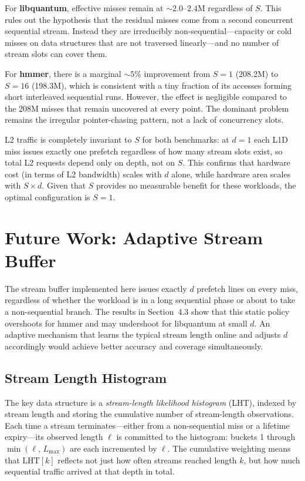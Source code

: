 \documentclass[10pt,twocolumn]{article}
\begin{document}
For \textbf{libquantum}, effective misses remain at ${\sim}2.0$--$2.4$M
regardless of $S$. This rules out the hypothesis that the residual misses
come from a second concurrent sequential stream. Instead they are
irreducibly non-sequential---capacity or cold misses on data structures
that are not traversed linearly---and no number of stream slots can cover
them.

For \textbf{hmmer}, there is a marginal ${\sim}5\%$ improvement from
$S{=}1$ (208.2M) to $S{=}16$ (198.3M), which is consistent with a tiny
fraction of its accesses forming short interleaved sequential runs.
However, the effect is negligible compared to the 208M misses that
remain uncovered at every point. The dominant problem remains the
irregular pointer-chasing pattern, not a lack of concurrency slots.

L2 traffic is completely invariant to $S$ for both benchmarks: at $d=1$
each L1D miss issues exactly one prefetch regardless of how many stream
slots exist, so total L2 requests depend only on depth, not on $S$. This
confirms that hardware cost (in terms of L2 bandwidth) scales with $d$
alone, while hardware area scales with $S \times d$. Given that $S$
provides no measurable benefit for these workloads, the optimal
configuration is $S{=}1$.

\section{Future Work: Adaptive Stream Buffer}
\label{sec:future}

The stream buffer implemented here issues exactly $d$ prefetch lines on
every miss, regardless of whether the workload is in a long sequential
phase or about to take a non-sequential branch. The results in
Section~4.3 show that this static policy overshoots for hmmer and
may undershoot for libquantum at small $d$. An adaptive mechanism that
learns the typical stream length online and adjusts $d$ accordingly
would achieve better accuracy and coverage simultaneously.

\subsection{Stream Length Histogram}

The key data structure is a \textit{stream-length likelihood histogram}
(LHT), indexed by stream length and storing the cumulative number of
stream-length observations. Each time a stream terminates---either from
a non-sequential miss or a lifetime expiry---its observed length $\ell$
is committed to the histogram: buckets 1 through
$\min(\ell,\,L_{\max})$ are each incremented by $\ell$. The cumulative
weighting means that $\text{LHT}[k]$ reflects not just how often streams
reached length $k$, but how much sequential traffic arrived at that
depth in total.
\end{document}
